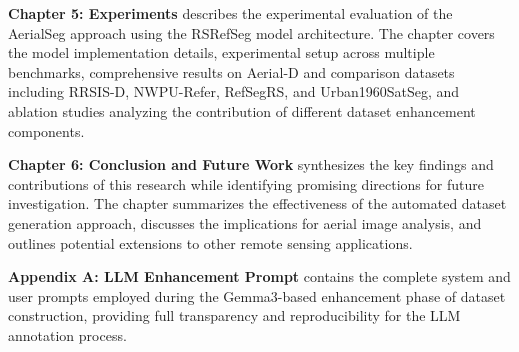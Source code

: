 \textbf{Chapter 5: Experiments} describes the experimental evaluation of the AerialSeg approach using the RSRefSeg model architecture. The chapter covers the model implementation details, experimental setup across multiple benchmarks, comprehensive results on Aerial-D and comparison datasets including RRSIS-D, NWPU-Refer, RefSegRS, and Urban1960SatSeg, and ablation studies analyzing the contribution of different dataset enhancement components.

\textbf{Chapter 6: Conclusion and Future Work} synthesizes the key findings and contributions of this research while identifying promising directions for future investigation. The chapter summarizes the effectiveness of the automated dataset generation approach, discusses the implications for aerial image analysis, and outlines potential extensions to other remote sensing applications.

\textbf{Appendix A: LLM Enhancement Prompt} contains the complete system and user prompts employed during the Gemma3-based enhancement phase of dataset construction, providing full transparency and reproducibility for the LLM annotation process.